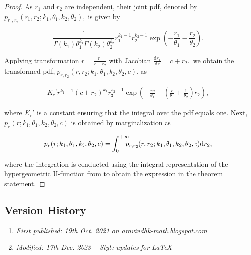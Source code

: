 \begin{proof}
As $r_1$ and $r_2$ are independent, their joint pdf, denoted by $p_{r_1,r_2}(r_1,r_2;k_1,\theta_1,k_2,\theta_2),$ is given by

\begin{equation}\frac{1}{\Gamma(k_1) \theta_1^{k_1} \Gamma(k_2) \theta_2^{k_2}} r_1^{k_1-1} r_2^{k_2-1} \exp\left(-\frac{r_1}{\theta_1}-\frac{r_2}{\theta_2}\right).\end{equation}

Applying transformation $r = \frac{r_1}{c+r_2}$ with Jacobian $\frac{\mathrm{d} r_1}{\mathrm{d} r} = c+r_2,$ we obtain the transformed pdf, $p_{r,r_2}(r,r_2;k_1,\theta_1,k_2,\theta_2,c)$, as

\begin{align}K_\mathrm{r}' r^{k_1-1} (c+r_2)^{k_1} r_2^{k_2-1}\exp\left(-\frac{rc}{\theta_1}-\left(\frac{r}{\theta_1} +\frac{1}{\theta_2}\right)r_2\right),\end{align}

where $K_\mathrm{r}'$ is a constant ensuring that the integral over the pdf equals one. Next, 
$p_r(r;k_1,\theta_1,k_2,\theta_2,c)$ is obtained by marginalization as

\begin{equation}p_r(r;k_1,\theta_1,k_2,\theta_2,c) = \int_{0}^{+\infty} \hspace{-0.25cm} p_{r,r_2}(r,r_2;k_1,\theta_1,k_2,\theta_2,c) \mathrm{d} r_2,\end{equation}

where the integration is conducted using the integral representation of the hypergeometric U-function from \cite[Chapter 13, Kummer function]{Olver2010} to obtain the expression in the theorem statement.
\end{proof}

\subsection{Version History}
\begin{enumerate}
	\item \emph{First published: 19th Oct. 2021 on aravindhk-math.blogspot.com}
	\item \emph{Modified: 17th Dec. 2023 -- Style updates for \LaTeX}
\end{enumerate}
